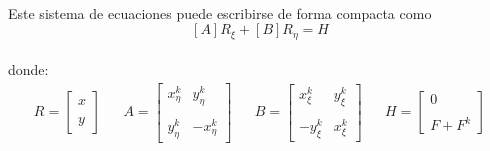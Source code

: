 \documentclass[letterpaper, openright, 12pt]{book}
\begin{document}
	\paragraph*{}
		Este sistema de ecuaciones puede escribirse de forma compacta como
		\begin{equation}
			\left[A \right] R_{\xi} + \left[ B \right] R_{\eta} = H
			\label{ec-hyper-compacta}
		\end{equation}\\ 
		donde:
		\begin{align*}
			R = \begin{bmatrix}
		 x \\ \\
		 y
			\end{bmatrix}&&
			A = \begin{bmatrix}
				x_{\eta}^{k} & y_{\eta}^{k} \\ \\
				y_{\eta}^{k} & -x_{\eta}^{k}
			\end{bmatrix}&&
			B = \begin{bmatrix}
				x_{\xi}^{k} & y_{\xi}^{k} \\ \\
				-y_{\xi}^{k} & x_{\xi}^{k}
			\end{bmatrix}&&
			H = \begin{bmatrix}
				0 \\ \\
				F + F^{k}
			\end{bmatrix}
		\end{align*}
		
\end{document}
